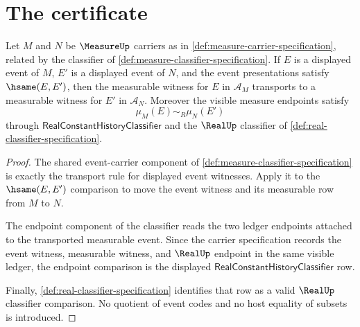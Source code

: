 \section{The certificate}
\label{sec:measure-certificate}

\begin{theorem}
\label{thm:measure-carrier-and-classifier-stability}
Let $M$ and $N$ be $\MeasureUp$ carriers as in \autoref{def:measure-carrier-specification}, related by the classifier of \autoref{def:measure-classifier-specification}. If $E$ is a displayed event of $M$, $E'$ is a displayed event of $N$, and the event presentations satisfy $\hsame(E,E')$, then the measurable witness for $E$ in $\mathcal A_M$ transports to a measurable witness for $E'$ in $\mathcal A_N$. Moreover the visible measure endpoints satisfy
$$
\mu_M(E)\sim_R\mu_N(E')
$$
through $\mathsf{RealConstantHistoryClassifier}$ and the $\RealUp$ classifier of \autoref{def:real-classifier-specification}.
\end{theorem}
\begin{proof}
The shared event-carrier component of \autoref{def:measure-classifier-specification} is exactly the transport rule for displayed event witnesses. Apply it to the $\hsame(E,E')$ comparison to move the event witness and its measurable row from $M$ to $N$.

The endpoint component of the classifier reads the two ledger endpoints attached to the transported measurable event. Since the carrier specification records the event witness, measurable witness, and $\RealUp$ endpoint in the same visible ledger, the endpoint comparison is the displayed $\mathsf{RealConstantHistoryClassifier}$ row.

Finally, \autoref{def:real-classifier-specification} identifies that row as a valid $\RealUp$ classifier comparison. No quotient of event codes and no host equality of subsets is introduced.
\end{proof}

